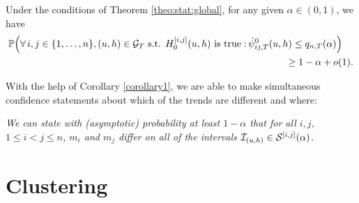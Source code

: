 \documentclass[a4paper,12pt]{article}
\begin{document}
\begin{corollary}\label{corollary1}
Under the conditions of Theorem \ref{theo:stat:global}, for any given $\alpha \in (0,1)$, we have
\begin{align*}
\mathbb{P}\Big( \forall \, i, j \in \{1, \ldots, n\}, (u, h) \in \mathcal{G}_T \text{ s.t. } H_0^{[i, j]}(u, h) \text{ is true}: & \, \hat{\psi}^0_{ij, T}(u, h) \le q_{n,T}(\alpha) \Big) \\ & \qquad \quad \quad \ge 1 - \alpha + o(1).
\end{align*}
\end{corollary} 


With the help of Corollary \ref{corollary1}, we are able to make simultaneous confidence statements about which of the trends are different and where:

\begin{center}
\begin{minipage}[c][1.25cm][c]{13cm}
\textit{We can state with (asymptotic) probability at least $1-\alpha$ that for all $i, j$, $1 \le i < j \le n$, $m_i$ and $m_j$ differ on all of the intervals $\mathcal{I}_{(u, h)} \in \mathcal{S}^{[i, j]}(\alpha)$.}
\end{minipage}
\end{center}



\section{Clustering}\label{sec:clustering}
\end{document}
